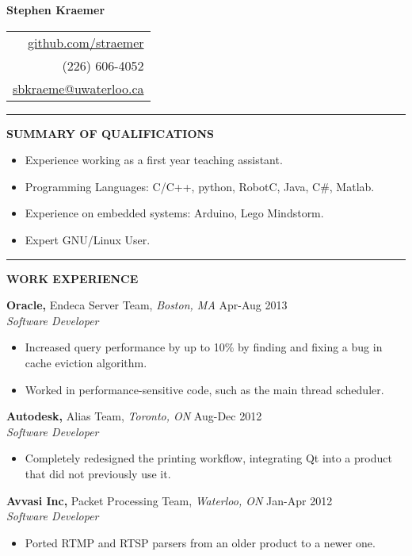 \documentclass{letter}
\begin{document}
{\Huge\bf Stephen Kraemer} \hfill
\begin{tabular}{r}
  \href{https://github.com/straemer}{github.com/straemer} \\
  (226) 606-4052 \\
  \href{mailto:sbkraeme@uwaterloo.ca}{sbkraeme@uwaterloo.ca}
\end{tabular}

\vskip 2pt
\hrule

{\large\bf SUMMARY OF QUALIFICATIONS}

\begin{itemize}
  \item Experience working as a first year teaching assistant.
  \item Programming Languages: C/C++, python, RobotC, Java, C#, Matlab.
  \item Experience on embedded systems: Arduino, Lego Mindstorm.
  \item Expert GNU/Linux User.
\end{itemize}

\vskip 2pt
\hrule
{\large\bf WORK EXPERIENCE}

{\bf Oracle,} Endeca Server Team, {\sl Boston, MA} \hfill Apr-Aug 2013 \\
{\sl Software Developer}
\begin{itemize}
  \item Increased query performance by up to 10\% by finding and fixing a bug in cache eviction algorithm.
  \item Worked in performance-sensitive code, such as the main thread scheduler.
\end{itemize}

{\bf Autodesk,} Alias Team, {\sl Toronto, ON} \hfill Aug-Dec 2012 \\
{\sl Software Developer}
\begin{itemize}
  \item Completely redesigned the printing workflow, integrating Qt into a product that did not previously use it.
\end{itemize}

{\bf Avvasi Inc,} Packet Processing Team, {\sl Waterloo, ON} \hfill Jan-Apr 2012 \\
{\sl Software Developer}
\begin{itemize}
  \item Ported RTMP and RTSP parsers from an older product to a newer one.
\end{itemize}
\end{document}
